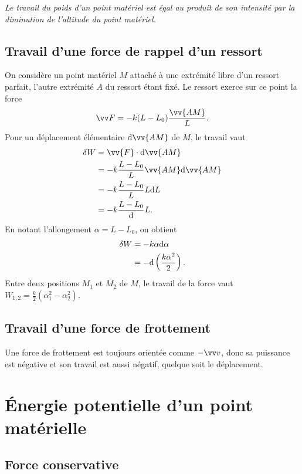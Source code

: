 \emph{Le travail du poids d'un point matériel est égal au produit de son intensité par la diminution de l'altitude du point matériel.}

\subsection{Travail d'une force de rappel d'un ressort}
\label{chap4-subsec:travailduneforcederappel}

On considère un point matériel $M$ attaché à une extrémité libre d'un ressort parfait, l'autre extrémité $A$ du ressort étant fixé. Le ressort exerce sur ce point la force
\begin{equation}
  \vF = -k(L-L_0)\frac{\vv{AM}}{L}.
\end{equation}
Pour un déplacement élémentaire $\D \vv{AM}$ de $M$, le travail vaut
\begin{align}
  \delta W &= \vv{F} \cdot \D \vv{AM} \\
  &= -k \frac{L-L_0}{L} \vv{AM} \D \vv{AM} \\
  &= -k \frac{L-L_0}{L} L \D L \\
  &= -k \frac{L-L_0} \D L.
\end{align}
En notant l'allongement $\alpha = L-L_0$, on obtient
\begin{align}
  \delta W &= -k\alpha \mathrm{d} \alpha\\
  &=-\mathrm{d} \left(\frac{k\alpha^2}{2}\right).
\end{align}
Entre deux positions $M_1$ et $M_2$ de $M$, le travail de la force vaut $W_{1,2}=\frac{k}{2}(\alpha_1^2-\alpha_2^2)$.

\subsection{Travail d'une force de frottement}
\label{chap4-subsec:travaildufrottement}

Une force de frottement est toujours orientée comme $-\vvv$, donc sa puissance est négative et son travail est aussi négatif, quelque soit le déplacement.

\section{Énergie potentielle d'un point matérielle}
\label{chap4-sec:energiepotentielle}

\subsection{Force conservative}
\label{chap4-subsec:forceconservative}

